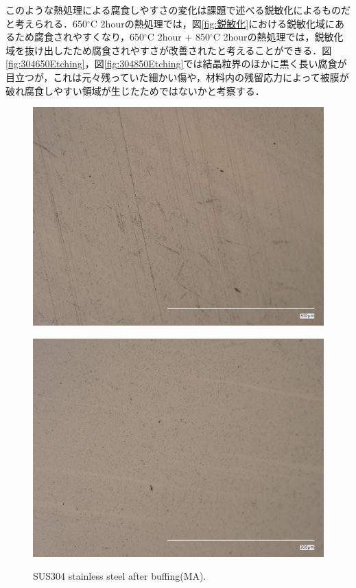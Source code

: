 このような熱処理による腐食しやすさの変化は課題で述べる鋭敏化によるものだと考えられる．650$^\circ$C 2hourの熱処理では，図\ref{fig:鋭敏化}における鋭敏化域にあるため腐食されやすくなり，650$^\circ$C 2hour + 850$^\circ$C 2hourの熱処理では，鋭敏化域を抜け出したため腐食されやすさが改善されたと考えることができる．図\ref{fig:304650Etching}，図\ref{fig:304850Etching}では結晶粒界のほかに黒く長い腐食が目立つが，これは元々残っていた細かい傷や，材料内の残留応力によって被膜が破れ腐食しやすい領域が生じたためではないかと考察する．
\begin{figure}[htbp]
    \begin{minipage}[htbp]{0.45\linewidth}
      \centering
      \includegraphics[keepaspectratio, scale=0.07]{fig/241218_304MA_3um.jpg}
      \label{fig:MA3um}
    \end{minipage}
    \begin{minipage}[htbp]{0.45\linewidth}
      \centering
      \includegraphics[keepaspectratio, scale=0.07]{fig/241218_304MA_1um.jpg}
      \label{fig:MA1um}
    \end{minipage}
    \centering
    \caption{SUS304 stainless steel after buffing(MA).}
    \label{fig:304MABuff}
\end{figure}
